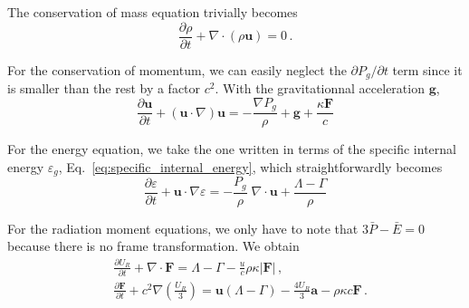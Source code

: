 \documentclass[../main.tex]{subfiles}
\begin{document}
\noindent The conservation of mass equation trivially becomes
\begin{equation}
    \frac{\partial\rho}{\partial t}+\nabla\cdot(\rho \bm{u})=0\,.
\end{equation}

\noindent For the conservation of momentum, we can easily neglect the $\partial P_g/\partial t$ term since it is smaller than the rest by a factor $c^2$.  With the gravitationnal acceleration $\bm{g}$,
\begin{equation}
    \frac{\partial\bm{u}}{\partial t}+(\bm{u}\cdot\nabla)\bm{u}=-\frac{\nabla P_g}{\rho}+\bm{g}+\frac{\kappa\bm{F}}{c}
\end{equation}

\noindent For the energy equation, we take the one written in terms of the specific internal energy $\varepsilon_g$, Eq.~\eqref{eq:specific_internal_energy}, which straightforwardly becomes
\begin{equation}
    \frac{\partial \varepsilon}{\partial t}+\bm{u}\cdot\nabla \varepsilon=-\frac{P_g}{\rho}\;\nabla\cdot\bm{u}+\frac{\Lambda-\Gamma}{\rho}
\end{equation}

\noindent For the radiation moment equations, we only have to note that $3\bar{P}-\bar{E}=0$ because there is no frame transformation.  We obtain
\begin{align}
&\frac{\partial U_R}{\partial t}+\nabla\cdot\bm{F}=\Lambda-\Gamma-\frac{u}{c}\rho\kappa|\bm{F}|\,,\\ &\frac{\partial \bm{F}}{\partial t}+c^2\nabla \left(\frac{U_R}{3}\right)=\bm{u}(\Lambda-\Gamma)-\frac{4U_R}{3}\bm{a}-\rho\kappa c\bm{F}\,.
\end{align}



\biblio
\end{document}
